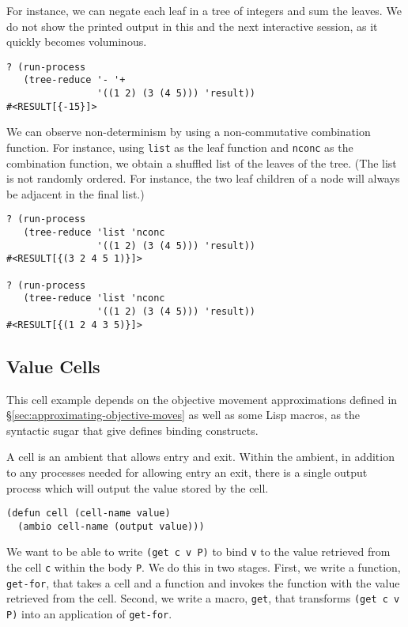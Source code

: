 \documentclass[12pt]{article}
\begin{document}
For instance, we can negate each leaf in a tree of integers and sum the leaves.
We do not show the printed output in this and the next interactive session, as it quickly becomes voluminous.

\begin{verbatim}
? (run-process 
   (tree-reduce '- '+
                '((1 2) (3 (4 5))) 'result))
#<RESULT[{-15}]>
\end{verbatim}

We can observe non-determinism by using a non-commutative combination function.
For instance, using \texttt{list} as the leaf function and \texttt{nconc} as the combination function, we obtain a shuffled list of the leaves of the tree.
(The list is not randomly ordered.
For instance, the two leaf children of a node will always be adjacent in the final list.)

\begin{verbatim}
? (run-process 
   (tree-reduce 'list 'nconc 
                '((1 2) (3 (4 5))) 'result))
#<RESULT[{(3 2 4 5 1)}]>

? (run-process 
   (tree-reduce 'list 'nconc 
                '((1 2) (3 (4 5))) 'result))
#<RESULT[{(1 2 4 3 5)}]>
\end{verbatim}

\subsection{Value Cells}
\label{sec:value-cells}

This cell example depends on the objective movement approximations defined in \S\ref{sec:approximating-objective-moves} as well as some Lisp macros, as the syntactic sugar that  give defines binding constructs.

A cell is an ambient that allows entry and exit.
Within the ambient, in addition to any processes needed for allowing entry an exit, there is a single output process which will output the value stored by the cell.

\begin{verbatim}
(defun cell (cell-name value)
  (ambio cell-name (output value)))
\end{verbatim}

We want to be able to write \texttt{(get c v P)} to bind \texttt{v} to the value retrieved from the cell \texttt{c} within the body \texttt{P}.
We do this in two stages.
First, we write a function, \texttt{get-for}, that takes a cell and a function and invokes the function with the value retrieved from the cell.
Second, we write a macro, \texttt{get}, that transforms \texttt{(get c v P)} into an application of \texttt{get-for}.
\end{document}
